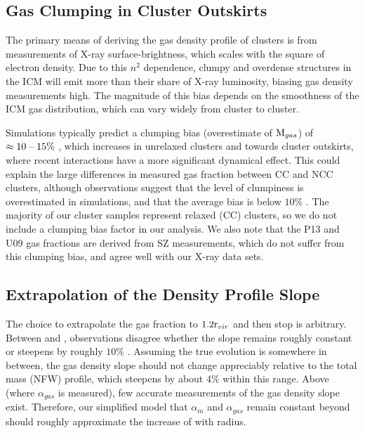 \subsection{Gas Clumping in Cluster Outskirts}
\label{sec:Limitations.Clumping}

The primary means of deriving the gas density profile of clusters is
from measurements of X-ray surface-brightness, which scales with the
square of electron density. Due to this $n^2$ dependence, clumpy and
overdense structures in the ICM will emit more than their share of
X-ray luminosity, biasing gas density measurements high. The magnitude
of this bias depends on the smoothness of the ICM gas distribution,
which can vary widely from cluster to cluster.

Simulations typically predict a clumping bias (overestimate of
$\textrm{M}{}_{gas}$) of $\approx10\;\textrm{--}\;15\%$ \citep{Nagai2011,Battaglia2013},
which increases in unrelaxed clusters and towards cluster outskirts,
where recent interactions have a more significant dynamical
effect. This could explain the large differences in measured gas
fraction between CC and NCC clusters, although observations suggest
that the level of clumpiness is overestimated in simulations, and that
the average bias is below $10\%$ \citep{Eckert2013c}. The majority of our
cluster samples represent relaxed (CC) clusters, so we do not include
a clumping bias factor in our analysis. We also note that the P13
\citep{PlanckIntV} and U09 \citep{Umetsu2009} gas fractions are
derived from SZ measurements, which do not suffer from this clumping
bias, and agree well with our X-ray data sets. 

\subsection{Extrapolation of the Density Profile Slope}
\label{sec:Limitations.Slope}
The choice to extrapolate the gas fraction to $1.2\textrm{r\ensuremath{_{vir}}}{}$ and then
stop is arbitrary. Between \rfive{} and \rtwo{}, observations disagree
whether the slope remains roughly constant \citep{Dai2010} or steepens
by roughly $10\%$ \citep{Ettori2009a}. Assuming the true evolution is
somewhere in between, the gas density slope should not change
appreciably relative to the total mass (NFW) profile, which steepens
by about $4\%$ within this range. Above \rtwo{} (where
$\alpha{}_{gas}$ is measured), few accurate measurements of the gas
density slope exist. Therefore, our simplified model that
$\alpha{}_{m}$ and $\alpha_{gas}$ remain constant beyond \rtwo{}
should roughly approximate the increase of \fg{} with radius.

